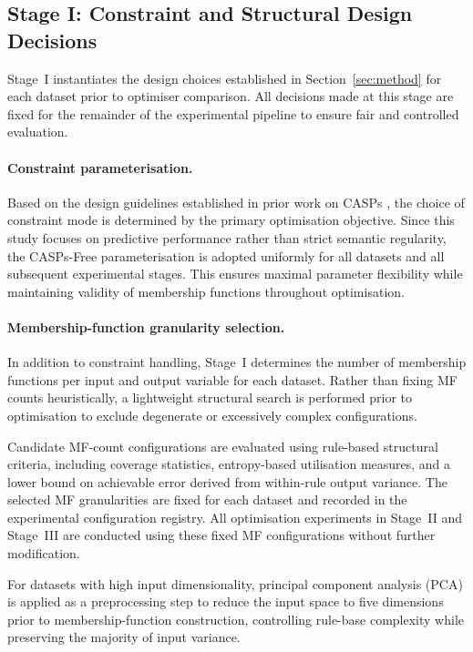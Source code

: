 \documentclass[a4paper,12pt,oneside]{article}
\begin{document}
\subsection{Stage I: Constraint and Structural Design Decisions}

Stage~I instantiates the design choices established in
Section~\ref{sec:method} for each dataset prior to optimiser comparison.
All decisions made at this stage are fixed for the remainder of the experimental
pipeline to ensure fair and controlled evaluation.

\paragraph*{Constraint parameterisation.}
Based on the design guidelines established in prior work on CASPs
\cite{chen2025casp}, the choice of constraint mode is determined by the primary
optimisation objective.
Since this study focuses on predictive performance rather than strict semantic
regularity, the CASPs-Free parameterisation is adopted uniformly for all
datasets and all subsequent experimental stages.
This ensures maximal parameter flexibility while maintaining validity of
membership functions throughout optimisation.

\paragraph*{Membership-function granularity selection.}
In addition to constraint handling, Stage~I determines the number of membership
functions per input and output variable for each dataset.
Rather than fixing MF counts heuristically, a lightweight structural search is
performed prior to optimisation to exclude degenerate or excessively complex
configurations.

Candidate MF-count configurations are evaluated using rule-based structural
criteria, including coverage statistics, entropy-based utilisation measures,
and a lower bound on achievable error derived from within-rule output variance.
The selected MF granularities are fixed for each dataset and recorded in the
experimental configuration registry.
All optimisation experiments in Stage~II and Stage~III are conducted using these
fixed MF configurations without further modification.

For datasets with high input dimensionality, principal component analysis (PCA)
is applied as a preprocessing step to reduce the input space to five dimensions
prior to membership-function construction, controlling rule-base complexity
while preserving the majority of input variance.
\end{document}
